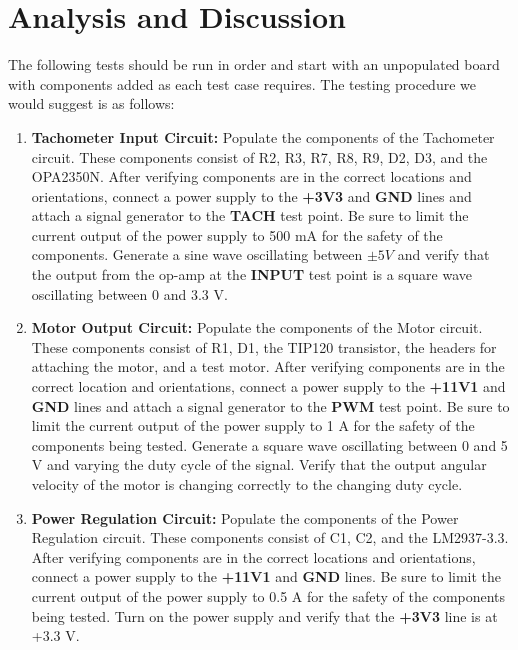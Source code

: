 \documentclass{article}
\begin{document}
\section{Analysis and Discussion}
	The following tests should be run in order and start with an unpopulated board with components added as each test case requires. The testing procedure we would suggest is as follows:
	\begin{enumerate}
		\item %
			\textbf{Tachometer Input Circuit:} Populate the components of the Tachometer circuit. These components consist of R2, R3, R7, R8, R9, D2, D3, and the OPA2350N. After verifying components are in the correct locations and orientations, connect a power supply to the \textbf{+3V3} and \textbf{GND} lines and attach a signal generator to the \textbf{TACH} test point. Be sure to limit the current output of the power supply to 500 mA for the safety of the components. Generate a sine wave oscillating between $\pm5V$ and verify that the output from the op-amp at the \textbf{INPUT} test point is a square wave oscillating between 0 and 3.3 V.
		\item %
			\textbf{Motor Output Circuit:} Populate the components of the Motor circuit. These components consist of R1, D1, the TIP120 transistor, the headers for attaching the motor, and a test motor. After verifying components are in the correct location and orientations, connect a power supply to the \textbf{+11V1} and \textbf{GND} lines and attach a signal generator to the \textbf{PWM} test point. Be sure to limit the current output of the power supply to 1 A for the safety of the components being tested. Generate a square wave oscillating between 0 and 5 V and varying the duty cycle of the signal. Verify that the output angular velocity of the motor is changing correctly to the changing duty cycle.
		\item %
			\textbf{Power Regulation Circuit:} Populate the components of the Power Regulation circuit. These components consist of C1, C2, and the LM2937-3.3. After verifying components are in the correct locations and orientations, connect a power supply to the \textbf{+11V1} and \textbf{GND} lines. Be sure to limit the current output of the power supply to 0.5 A for the safety of the components being tested. Turn on the power supply and verify that the \textbf{+3V3} line is at +3.3 V.
	\end{enumerate}
\end{document}
